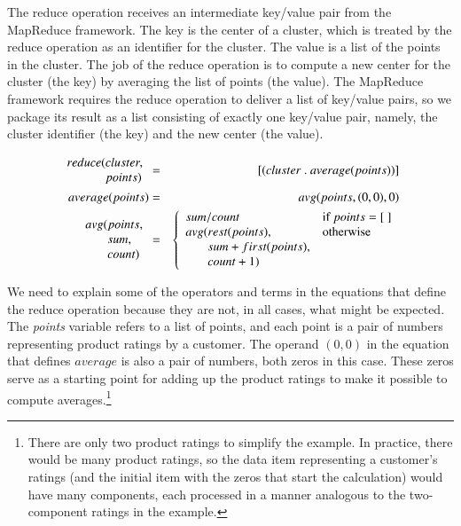 The reduce operation receives
an intermediate key/value pair from the MapReduce framework.
The key is the center of a cluster, which is treated by the reduce operation
as an identifier for the cluster.
The value is a list of the points in the cluster.
The job of the reduce operation is to compute a new
center for the cluster (the key) by averaging the list of points (the value).
The MapReduce framework requires the reduce operation to deliver
a list of key/value pairs, so we package its result as a list consisting
of exactly one key/value pair, namely, the cluster identifier (the key) and the
new center (the value).
\begin{spacing}{0.9}
\begin{eqnarray*}
    \begin{array}{l@{}l}
        reduce(&cluster, \\
               &points)
    \end{array} &=& [ ( cluster ~.~ average(points) ) ] \\
average(points) &=& avg(points, (0,0), 0) \\
\begin{array}{l@{}l}
    avg(&points, \\
        &sum, \\
        &count)
\end{array} &=&
    \left\{
        \begin{array}{l@{}ll}
            \multicolumn{2}{l}{sum / count} & \mbox{if } points = [~] \\
            avg(& rest(points),             & \mbox{otherwise} \\
                & sum+first(points),        & \\
                & count+1)                  & \\
        \end{array}
    \right.
\end{eqnarray*}
\end{spacing}

We need to explain some of the operators and terms
in the equations that define the reduce operation
because they are not, in all cases, what might be expected.
The \emph{points} variable refers to a list of points,
and each point is a pair of numbers representing product ratings
by a customer.
The operand $(0,0)$ in the equation that defines $average$ is
also a pair of numbers, both zeros in this case.
These zeros serve as a starting point for adding
up the product ratings to make it possible to compute
averages.\footnote{There are only two product ratings
to simplify the example. In practice, there would be
many product ratings, so the data item representing
a customer's ratings (and the initial item with the
zeros that start the calculation)
would have many components, each processed in a manner analogous
to the two-component ratings in the example.}

